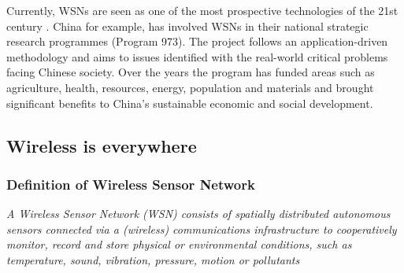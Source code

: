 Currently, WSNs are seen as one of the most prospective technologies of the 21st century . China for example, has involved WSNs in their national strategic research programmes (Program 973)\citep{CHINA}. The project follows an application-driven methodology and aims to issues identified with the real-world critical problems facing Chinese society. Over the years the program has funded areas such as agriculture, health, resources, energy, population and materials and brought significant benefits to China's sustainable economic and social development.
\subsection{Wireless is everywhere}
\subsubsection{Definition of Wireless Sensor Network}
\emph{A Wireless Sensor Network (WSN) consists of spatially distributed autonomous sensors connected via a (wireless) communications infrastructure to cooperatively monitor, record and store physical or
environmental conditions, such as temperature, sound, vibration, pressure, motion or pollutants} \citep{SEBA}
